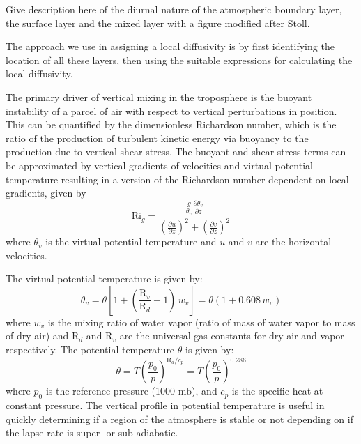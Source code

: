 Give description here of the diurnal nature of the atmospheric boundary layer, the surface
layer and the mixed layer with a figure modified after Stoll.

The approach we use in assigning a local diffusivity is by first identifying the location
of all these layers, then using the suitable expressions for calculating the local
diffusivity.

The primary driver of vertical mixing in the troposphere is the buoyant instability of a parcel
of air with respect to vertical perturbations in position. This can be quantified
by the dimensionless Richardson number, which is the ratio of the production of turbulent
kinetic energy via buoyancy to the production due to vertical shear stress.
The buoyant and shear stress terms can be approximated by vertical gradients of velocities
and virtual potential temperature resulting in a version of the Richardson number dependent on
local gradients, given by
\begin{equation}\label{VarDiff_Eq_Rig}
\mathrm{Ri}_g = \frac{\frac{g}{\theta_v}\frac{\partial \theta_v}{\partial z}}
{\left( \frac{\partial u}{\partial z}\right)^2 + \left( \frac{\partial v}{\partial z}\right)^2}
\end{equation}
where $\theta_v$ is the virtual potential temperature and $u$ and $v$ are the horizontal velocities.

The virtual potential temperature is given by:
\begin{equation}\label{VarDiff_Eq_Thetav}
\theta_v = \theta \left[ 1 + \left( \frac{\mathrm{R}_{v}}{\mathrm{R}_{d}}-1\right) \, w_v \right] = \theta \left( 1 + 0.608 \, w_v \right)
\end{equation}
where $w_v$ is the mixing ratio of water vapor
(ratio of mass of water vapor to mass of dry air) %
and $\mathrm{R}_{d}$ and $\mathrm{R}_{v}$ are the universal gas constants for dry air and vapor respectively.
The potential temperature $\theta$ is given by:
\begin{equation}\label{VarDiff_Eq_Theta}
\theta = T \left( \frac{p_0}{p}\right)^{\mathrm{R}_{d}/c_p} = T \left( \frac{p_0}{p}\right)^{0.286}
\end{equation}
where $p_0$ is the reference pressure (1000 $\mathrm{mb}$), and $c_p$ is the specific heat at constant pressure.
The vertical profile in potential temperature is useful in quickly determining if a region of the
atmosphere is stable or not depending on if the lapse rate is super- or sub-adiabatic.

